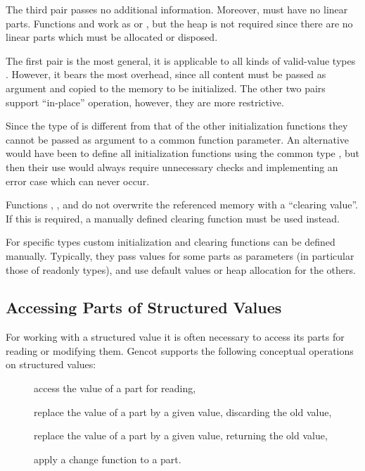 The third pair passes no additional information. Moreover,  must have no linear parts. 
Functions  and  work as  or ,
but the heap is not required since there are no linear parts which must be allocated or disposed.

The first pair is the most general, it is applicable to all kinds of valid-value types . However, it bears the
most overhead, since all content must be passed as argument and copied to the memory to be initialized. The other
two pairs support ``in-place'' operation, however, they are more restrictive. 

Since the type of  is different from that of the other initialization functions they cannot 
be passed as argument to a common function parameter. An alternative would have been to define all initialization
functions using the common type , but then their use would always require unnecessary checks and
implementing an error case which can never occur.

Functions , , and  do not overwrite the referenced memory with a 
``clearing value''. If this is required, a manually defined clearing function must be used instead.

For specific types  custom initialization and clearing functions can be defined manually. Typically, they 
pass values for some parts as parameters (in particular those of readonly types), and use default values or heap
allocation for the others.

\subsection{Accessing Parts of Structured Values}
\label{design-operations-parts}

For working with a structured value it is often necessary to access its parts for reading or modifying them.
Gencot supports the following conceptual operations on structured values:
\begin{description}
  \item[] access the value of a part for reading,
  \item[] replace the value of a part by a given value, discarding the old value,
  \item[] replace the value of a part by a given value, returning the old value,
  \item[] apply a change function to a part.
\end{description}

